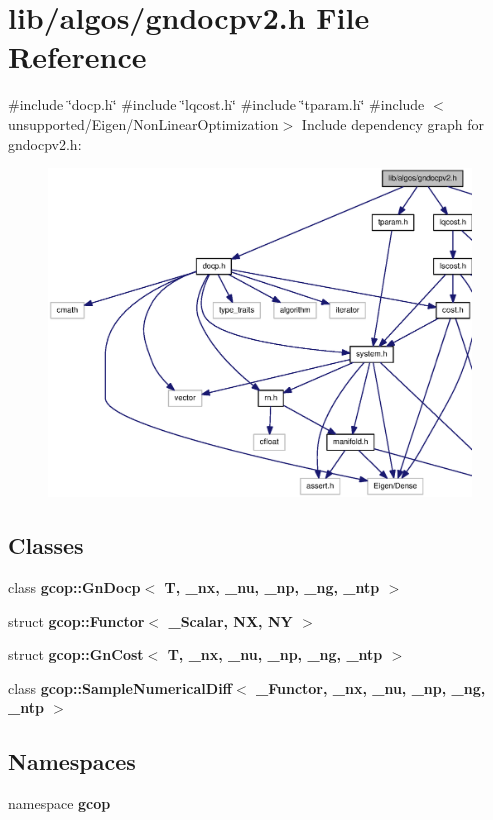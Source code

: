 \section{lib/algos/gndocpv2.h \-File \-Reference}
\label{gndocpv2_8h}
{\ttfamily \#include \char`\"{}docp.\-h\char`\"{}}\*
{\ttfamily \#include \char`\"{}lqcost.\-h\char`\"{}}\*
{\ttfamily \#include \char`\"{}tparam.\-h\char`\"{}}\*
{\ttfamily \#include $<$unsupported/\-Eigen/\-Non\-Linear\-Optimization$>$}\*
\-Include dependency graph for gndocpv2.\-h\-:
\nopagebreak
\begin{figure}[H]
\begin{center}
\leavevmode
\includegraphics[width=350pt]{gndocpv2_8h__incl}
\end{center}
\end{figure}
\subsection*{\-Classes}
\begin{DoxyCompactItemize}
\item 
class {\bf gcop\-::\-Gn\-Docp$<$ T, \-\_\-nx, \-\_\-nu, \-\_\-np, \-\_\-ng, \-\_\-ntp $>$}
\item 
struct {\bf gcop\-::\-Functor$<$ \-\_\-\-Scalar, N\-X, N\-Y $>$}
\item 
struct {\bf gcop\-::\-Gn\-Cost$<$ T, \-\_\-nx, \-\_\-nu, \-\_\-np, \-\_\-ng, \-\_\-ntp $>$}
\item 
class {\bf gcop\-::\-Sample\-Numerical\-Diff$<$ \-\_\-\-Functor, \-\_\-nx, \-\_\-nu, \-\_\-np, \-\_\-ng, \-\_\-ntp $>$}
\end{DoxyCompactItemize}
\subsection*{\-Namespaces}
\begin{DoxyCompactItemize}
\item 
namespace {\bf gcop}
\end{DoxyCompactItemize}
